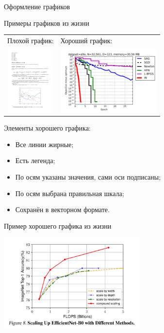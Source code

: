 \documentclass[fleqn, xcolor=x11names]{beamer}
\begin{document}
\begin{section}{Оформление графиков}
\begin{frame}{Примеры графиков из жизни}
\begin{center}
    \tabcolsep=15pt
    \begin{tabular}{ll}
        Плохой график: & Хороший график: \\
        \includegraphics[height=3.5cm]{bag_picture.pdf} & \includegraphics[height=3.5cm]{a9a_epoch.pdf}
    \end{tabular}
\end{center}

Элементы хорошего графика:
\begin{itemize}
    \item Все линии жирные;
    \item Есть легенда;
    \item По осям указаны значения, сами оси подписаны;
    \item По осям выбрана правильная шкала;
    \item Сохранён в векторном формате.
\end{itemize}

\end{frame}

\begin{frame}{Пример хорошего графика из жизни}
	\begin{center}
		\includegraphics[height=5.0cm]{good_plot.png}
	\end{center}
\end{frame}


\end{section}
\end{document}

